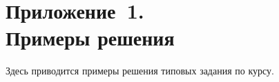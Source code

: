\section*{Приложение~1.\\ Примеры решения}

Здесь приводится примеры решения типовых задания по курсу.